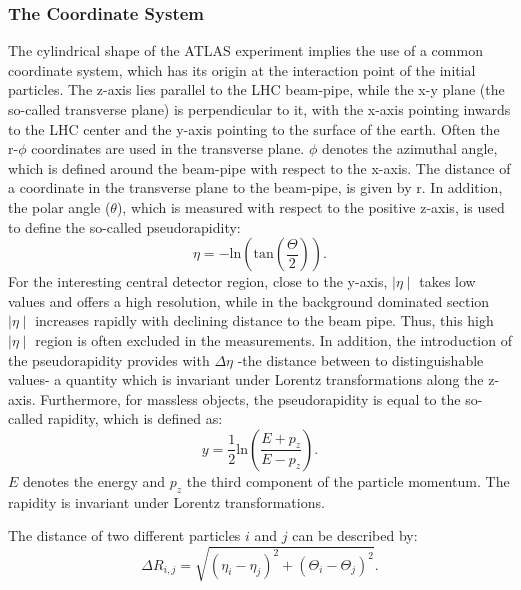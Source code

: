 \subsubsection{The Coordinate System }\label{Coordinate}
The cylindrical shape of the ATLAS experiment implies the use of a common coordinate system, which has its origin at the interaction point of the initial particles. 
The z-axis lies parallel to the LHC beam-pipe, while the  x-y plane (the so-called transverse plane)  is perpendicular to it, with the x-axis pointing inwards to the LHC center and the y-axis pointing to the surface of the earth.  Often the r-$\phi$ coordinates are used in the transverse plane.
 $\phi$ denotes the azimuthal angle, which is defined  around the beam-pipe with respect to the x-axis.
 The distance of a coordinate in the transverse plane to the beam-pipe, is given by r.  
 In addition, the polar angle ($\theta$), which is measured  with respect to the positive z-axis, is used to define the so-called pseudorapidity:
\begin{equation}\label{pseudorapidity}\eta = -\text{ln}\left(\text{tan}\left(\frac{\Theta}{2}\right)\right).
\end{equation}  
 For the interesting central detector region, close to the y-axis, $\mid\eta\mid$ takes low values and offers a high resolution, while in the background dominated section $\mid\eta\mid$ increases rapidly with declining distance to the beam pipe. Thus, this high $\mid\eta\mid$  region is often excluded in the measurements. In addition, the introduction of the pseudorapidity provides with $\Delta \eta$ -the distance between to distinguishable values- a quantity which is invariant under Lorentz transformations along the z-axis. Furthermore, for massless objects, the pseudorapidity is equal to the so-called rapidity, which is defined as:
\begin{equation}\label{rapidity}
y = \frac{1}{2}\text{ln}\left(\frac{E + p_z}{E - p_z}\right).
\end{equation}
$E$ denotes the energy and $p_z$ the third component of the particle momentum. The rapidity is invariant under Lorentz transformations. 


The distance of two different particles $i$ and $j$ can be described by:
\begin{equation}\label{dinstance}
\Delta R_{i,j} = \sqrt{(\eta_i-\eta_j)^2+(\Theta_i-\Theta_j)^2}.
\end{equation}
   


